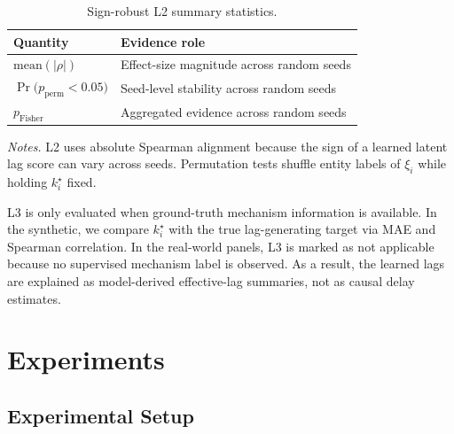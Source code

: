 \documentclass[conference]{IEEEtran}
\begin{document}
\begin{table}[!tbhp]
\centering
\caption{Sign-robust L2 summary statistics.}
\label{tab:l2_sign_robust_quantities}
\setlength{\tabcolsep}{5pt}
\renewcommand{\arraystretch}{1.1}
\begin{tabularx}{\columnwidth}{@{}l l@{}}
\toprule
Quantity & Evidence role \\
\midrule
$\mathrm{mean}(|\rho|)$ & Effect-size magnitude across random seeds \\
$\Pr\bigl(p_{\mathrm{perm}}<0.05\bigr)$ & Seed-level stability across random seeds \\
$p_{\mathrm{Fisher}}$ & Aggregated evidence across random seeds \\
\bottomrule
\end{tabularx}
\par\smallskip
{\footnotesize\raggedright\textit{Notes.} L2 uses absolute Spearman alignment because the sign of a learned latent lag score can vary across seeds. Permutation tests shuffle entity labels of $\xi_i$ while holding $k_i^\star$ fixed.\par}
\end{table}


L3 is only evaluated when ground-truth mechanism information is available. In the synthetic, we compare $k_i^\star$ with the true lag-generating target via MAE and Spearman correlation. In the real-world panels, L3 is marked as not applicable because no supervised mechanism label is observed. As a result, the learned lags are explained as model-derived effective-lag summaries, not as causal delay estimates.

\section{Experiments}
\subsection{Experimental Setup}
\end{document}
